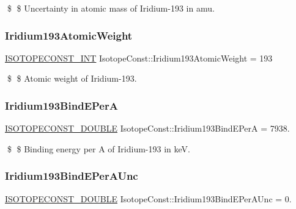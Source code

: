 \$ \$ Uncertainty in atomic mass of Iridium-\/193 in amu. \mbox{\label{group___isotope_const-_iridium-_ir193_ga8f93ca97e165ef87bd7664720d292de1}} 
\subsubsection{\texorpdfstring{Iridium193\+Atomic\+Weight}{Iridium193AtomicWeight}}
{\footnotesize\ttfamily \mbox{\hyperlink{group___isotope_const-_macros_ga5f18360b3e99483a35c32d789e62621c}{I\+S\+O\+T\+O\+P\+E\+C\+O\+N\+S\+T\+\_\+\+I\+NT}} Isotope\+Const\+::\+Iridium193\+Atomic\+Weight = 193}

\$ \$ Atomic weight of Iridium-\/193. \mbox{\label{group___isotope_const-_iridium-_ir193_gac3b89c1ff120e06381426742428506dd}} 
\subsubsection{\texorpdfstring{Iridium193\+Bind\+E\+PerA}{Iridium193BindEPerA}}
{\footnotesize\ttfamily \mbox{\hyperlink{group___isotope_const-_macros_ga8f45a7272ce02c0b4c65c44636ed719a}{I\+S\+O\+T\+O\+P\+E\+C\+O\+N\+S\+T\+\_\+\+D\+O\+U\+B\+LE}} Isotope\+Const\+::\+Iridium193\+Bind\+E\+PerA = 7938.}

\$ \$ Binding energy per A of Iridium-\/193 in keV. \mbox{\label{group___isotope_const-_iridium-_ir193_ga6775ffb99a49e4f6815765160dab28f9}} 
\subsubsection{\texorpdfstring{Iridium193\+Bind\+E\+Per\+A\+Unc}{Iridium193BindEPerAUnc}}
{\footnotesize\ttfamily \mbox{\hyperlink{group___isotope_const-_macros_ga8f45a7272ce02c0b4c65c44636ed719a}{I\+S\+O\+T\+O\+P\+E\+C\+O\+N\+S\+T\+\_\+\+D\+O\+U\+B\+LE}} Isotope\+Const\+::\+Iridium193\+Bind\+E\+Per\+A\+Unc = 0.}

